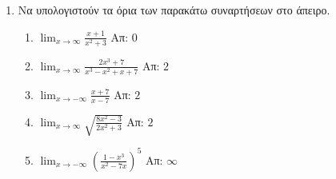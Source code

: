 



\pagestyle{askhseis}
\everymath{\displaystyle}




\begin{center}
  \minibox{\large\bfseries \textcolor{Col1}{Ασκήσεις στα Όρια}}
\end{center}


\vspace{\baselineskip}


\renewcommand{\theenumii}{\roman{enumii}}

\begin{enumerate}
  \item Να υπολογιστούν τα όρια των παρακάτω συναρτήσεων στο άπειρο.
    \begin{enumerate}
      \item $\lim_{x\to \infty}\frac{x+1}{x^2+3}$ \hfill Απ: $0$
      \item $\lim_{x\to \infty}\frac{2x^3+7}{x^3-x^2+x+7}$ \hfill Απ: $2$
      \item $\lim_{x\to -\infty}\frac{x+7}{x-7}$ \hfill Απ: $2$
      \item $\lim_{x\to \infty}\sqrt{\frac{8x^2-3}{2x^2 +3}}$ \hfill Απ: $2$
      \item $\lim_{x\to -\infty}\left(\frac{1-x^3}{x^2-7x}\right)^5$ \hfill Απ: $\infty$
    \end{enumerate}


\end{enumerate}
